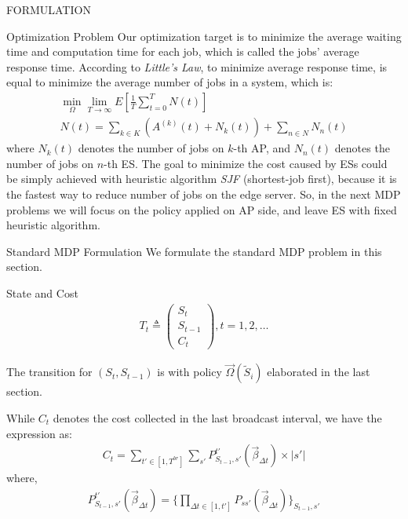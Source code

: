 \documentclass[10pt, conference, letterpaper]{IEEEtran}
\begin{document}
\begin{section}{FORMULATION}
\begin{subsection}{Optimization Problem}
            Our optimization target is to minimize the average waiting time and computation time for each job, which is called the jobs' average response time. According to \emph{Little’s Law}, to minimize average response time, is equal to minimize the average number of jobs in a system, which is:
            \begin{gather}
                \min_{\Omega} \lim_{T \to \infty} E[\frac{1}{T} \sum_{t=0}^{T} N(t)]
                \\
                N(t) = \sum_{k \in K} (A^{(k)}(t) + N_k(t))
                        + \sum_{n \in N} N_n(t)
            \end{gather}
            where $N_k(t)$ denotes the number of jobs on $k$-th AP, and $N_n(t)$ denotes the number of jobs on $n$-th ES.
            The goal to minimize the cost caused by ESs could be simply achieved with heuristic algorithm \emph{SJF} (shortest-job first), because it is the fastest way to reduce number of jobs on the edge server. So, in the next MDP problems we will focus on the policy applied on AP side, and leave ES with fixed heuristic algorithm.
        \end{subsection}

        \begin{subsection}{Standard MDP Formulation}
            We formulate the standard MDP problem in this section.

            \begin{subsubsection}{State and Cost}
                \begin{align}
                    T_t \triangleq \begin{pmatrix}
                        S_t \\ S_{t-1} \\ C_t
                    \end{pmatrix}, t=1,2,\dots
                \end{align}

                The transition for $(S_{t}, S_{t-1})$ is with policy $\vec{\Omega}(\tilde{S}_i)$ elaborated in the last section.
                
                While $C_t$ denotes the cost collected in the last broadcast interval, we have the expression as:
                \begin{align}
                    C_t = \sum_{t'\in[1,T^{br}]} \sum_{s'} P_{S_{t-1},s'}^{t'}(\vec{\beta}_{\Delta{t}}) \times |s'|
                \end{align}
                where,
                \begin{align}
                    P_{S_{t-1},s'}^{t'}(\vec{\beta}_{\Delta{t}})
                    = \{
                        \prod_{\Delta{t} \in [1,t']} P_{ss'}(\vec{\beta}_{\Delta{t}})
                    \}_{S_{t-1}, s'}
                \end{align}
            \end{subsubsection}


\end{subsection}
\end{section}
\end{document}

